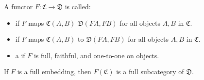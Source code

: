 A functor $F: \mathfrak{C} \to \mathfrak{D}$ is called:
\begin{itemize}
\item {} if $F$ maps $\mathfrak{C}(A, B)$  $\mathfrak{D}(FA, FB)$ for all objects $A, B$ in $\mathfrak{C}$.
\item {} if $F$ maps $\mathfrak{C}(A, B)$  to $\mathfrak{D}(FA, FB)$ for all objects $A, B$ in $\mathfrak{C}$.
\item a  if $F$ is full, faithful, and one-to-one on objects.
\end{itemize}
If $F$ is a full embedding, then $F(\mathfrak{C})$ is a full subcategory of $\mathfrak{D}$.
